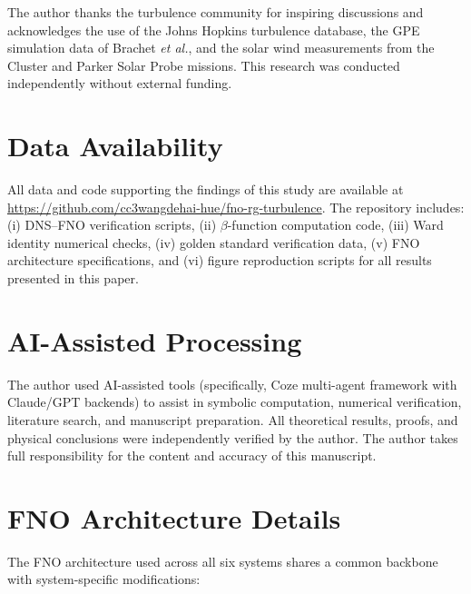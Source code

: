 \begin{acknowledgments}
The author thanks the turbulence community for inspiring discussions and acknowledges the use of the Johns Hopkins turbulence database, the GPE simulation data of Brachet \textit{et al.}, and the solar wind measurements from the Cluster and Parker Solar Probe missions. This research was conducted independently without external funding.
\end{acknowledgments}

\section*{Data Availability}
All data and code supporting the findings of this study are available at \url{https://github.com/cc3wangdehai-hue/fno-rg-turbulence}. The repository includes: (i) DNS--FNO verification scripts, (ii) $\beta$-function computation code, (iii) Ward identity numerical checks, (iv) golden standard verification data, (v) FNO architecture specifications, and (vi) figure reproduction scripts for all results presented in this paper.

\section*{AI-Assisted Processing}
The author used AI-assisted tools (specifically, Coze multi-agent framework with Claude/GPT backends) to assist in symbolic computation, numerical verification, literature search, and manuscript preparation. All theoretical results, proofs, and physical conclusions were independently verified by the author. The author takes full responsibility for the content and accuracy of this manuscript.

\appendix

\section{FNO Architecture Details\label{app:fno}}

The FNO architecture used across all six systems shares a common backbone with system-specific modifications:

